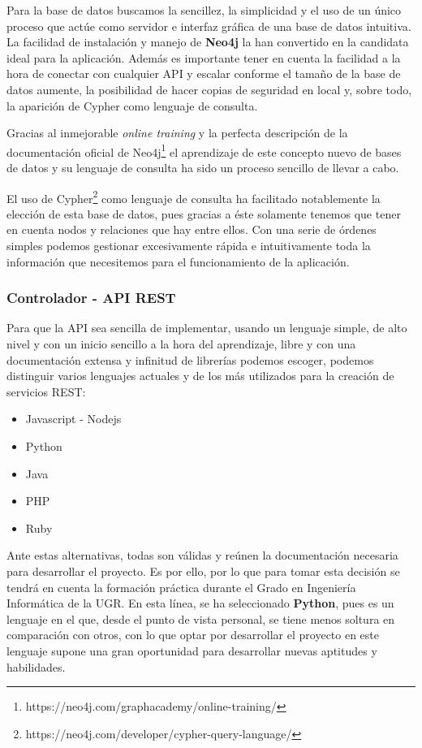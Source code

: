 Para la base de datos buscamos la sencillez, la simplicidad y el uso de un único proceso que actúe como servidor e interfaz gráfica de una base de datos intuitiva. La facilidad de instalación y manejo de \textbf{Neo4j} la han convertido en la candidata ideal para la aplicación.  Además es importante tener en cuenta la facilidad a la hora de conectar con cualquier API y escalar conforme el tamaño de la base de datos aumente, la posibilidad de hacer copias de seguridad en local y, sobre todo, la aparición de Cypher como lenguaje de consulta\cite{neovstitan}.

Gracias al inmejorable \textit{online training} y la perfecta descripción de la documentación oficial de Neo4j\footnote{https://neo4j.com/graphacademy/online-training/} el aprendizaje de este concepto nuevo de bases de datos y su lenguaje de consulta ha sido un proceso sencillo de llevar a cabo.

El uso de Cypher\footnote{https://neo4j.com/developer/cypher-query-language/} como lenguaje de consulta ha facilitado notablemente la elección de esta base de datos, pues gracias a éste solamente tenemos que tener en cuenta nodos y relaciones que hay entre ellos. Con una serie de órdenes simples podemos gestionar excesivamente rápida e intuitivamente toda la información que necesitemos para el funcionamiento de la aplicación.

\subsubsection{Controlador - API REST}

Para que la API sea sencilla de implementar, usando un lenguaje simple, de alto nivel y con un inicio sencillo a la hora del aprendizaje, libre y con una documentación extensa y infinitud de librerías podemos escoger, podemos distinguir varios lenguajes actuales y de los más utilizados para la creación de servicios REST\cite{apirest1}\cite{apirest2}\cite{apirest3}:

\begin{itemize}
    \item Javascript - Nodejs
    \item Python
    \item Java 
    \item PHP
    \item Ruby
\end{itemize}

Ante estas alternativas, todas son válidas y reúnen la documentación necesaria para desarrollar el proyecto. Es por ello, por lo que para tomar esta decisión se tendrá en cuenta la formación  práctica durante el Grado en Ingeniería Informática de la UGR. En esta línea, se ha seleccionado \textbf{Python}, pues es un lenguaje en el que, desde el punto de vista personal, se tiene menos soltura en comparación con otros, con lo que optar por desarrollar el proyecto en este lenguaje supone una gran oportunidad para desarrollar nuevas aptitudes y habilidades.

